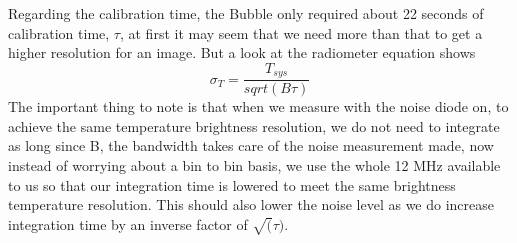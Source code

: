 \documentclass[12 pt]{article}
\begin{document}
Regarding the calibration time, the Bubble only required about 22
seconds of calibration time, $\tau$,  at first it may seem that we need
more than that to get a higher resolution for an image. But a look at
the radiometer equation shows
\begin{equation}
  \sigma_{T}= \frac{T_{sys}}{sqrt(B\tau)}
\end{equation}
The important thing to note is that when we measure with the noise diode
on, to achieve the same temperature brightness resolution, we do not
need to integrate as long since B, the bandwidth takes care of the noise
measurement made, now instead of worrying about a bin to bin basis, we
use the whole 12 MHz available to us so that our integration time is
lowered to meet the same brightness temperature resolution. This should
also lower the noise level as we do increase integration time by an
inverse factor of $\sqrt(\tau)$.
\end{document}
